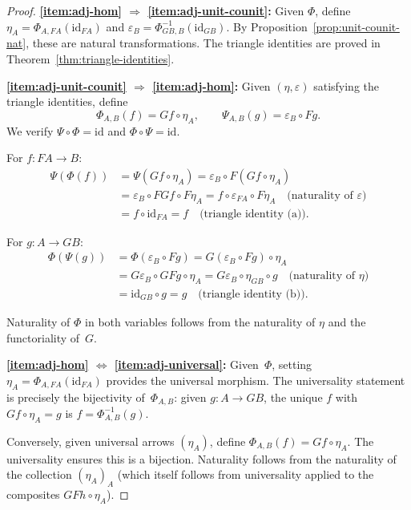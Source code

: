 \documentclass[a4paper,12pt]{book}
\newcommand{\id}{\mathrm{id}}
\theoremstyle{definition}
\theoremstyle{plain}
\theoremstyle{remark}
\begin{document}
\begin{proof}
\textbf{\ref{item:adj-hom} $\Rightarrow$ \ref{item:adj-unit-counit}:}
Given $\Phi$, define $\eta_A = \Phi_{A,FA}(\id_{FA})$ and
$\varepsilon_B = \Phi^{-1}_{GB,B}(\id_{GB})$.
By Proposition~\ref{prop:unit-counit-nat}, these are natural transformations.
The triangle identities are proved in Theorem~\ref{thm:triangle-identities}.

\medskip
\textbf{\ref{item:adj-unit-counit} $\Rightarrow$ \ref{item:adj-hom}:}
Given $(\eta,\varepsilon)$ satisfying the triangle identities, define
\[
    \Phi_{A,B}(f) = Gf\circ\eta_A, \qquad
    \Psi_{A,B}(g) = \varepsilon_B\circ Fg.
\]
We verify $\Psi\circ\Phi = \id$ and $\Phi\circ\Psi = \id$.

For $f\colon FA\to B$:
\begin{align*}
    \Psi(\Phi(f)) &= \Psi(Gf\circ\eta_A)
    = \varepsilon_B\circ F(Gf\circ\eta_A) \\
    &= \varepsilon_B\circ FGf\circ F\eta_A
    = f\circ\varepsilon_{FA}\circ F\eta_A \quad\text{(naturality of $\varepsilon$)}\\
    &= f\circ\id_{FA} = f \quad\text{(triangle identity (a))}.
\end{align*}

For $g\colon A\to GB$:
\begin{align*}
    \Phi(\Psi(g)) &= \Phi(\varepsilon_B\circ Fg)
    = G(\varepsilon_B\circ Fg)\circ\eta_A \\
    &= G\varepsilon_B\circ GFg\circ\eta_A
    = G\varepsilon_B\circ\eta_{GB}\circ g \quad\text{(naturality of $\eta$)}\\
    &= \id_{GB}\circ g = g \quad\text{(triangle identity (b))}.
\end{align*}

Naturality of $\Phi$ in both variables follows from the naturality of
$\eta$ and the functoriality of~$G$.

\medskip
\textbf{\ref{item:adj-hom} $\Leftrightarrow$ \ref{item:adj-universal}:}
Given~$\Phi$, setting $\eta_A = \Phi_{A,FA}(\id_{FA})$ provides the
universal morphism.  The universality statement is precisely the
bijectivity of~$\Phi_{A,B}$: given $g\colon A\to GB$, the unique
$f$ with $Gf\circ\eta_A = g$ is $f = \Phi^{-1}_{A,B}(g)$.

Conversely, given universal arrows $(\eta_A)$, define
$\Phi_{A,B}(f) = Gf\circ\eta_A$.  The universality ensures this is
a bijection.  Naturality follows from the naturality of the collection
$(\eta_A)_A$ (which itself follows from universality applied to the
composites $GFh\circ\eta_A$).
\end{proof}
\end{document}
